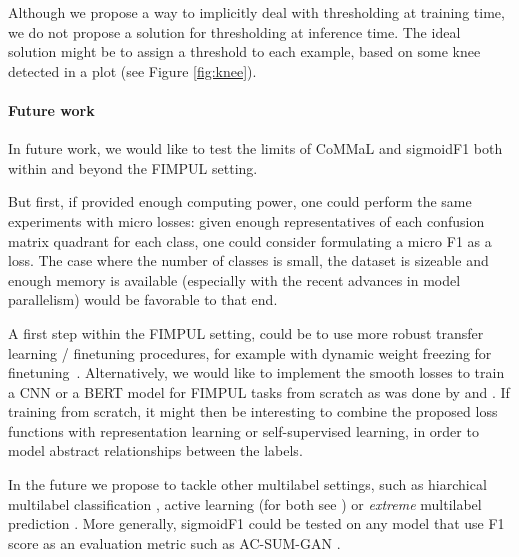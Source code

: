 Although we propose a way to implicitly deal with thresholding at training time, we do not propose a solution for thresholding at inference time. The ideal solution might be to assign a threshold to each example, based on some knee detected in a plot (see Figure \ref{fig:knee}).






\paragraph{Future work}
In future work, we would like to test the limits of CoMMaL and sigmoidF1 both within and beyond the FIMPUL setting.

But first, if provided enough computing power, one could perform the same experiments with micro losses: given enough representatives of each confusion matrix quadrant for each class, one could consider formulating a micro F1 as a loss. The case where the number of classes is small, the dataset is sizeable and enough memory is available (especially with the recent advances in model parallelism) would be favorable to that end.


A first step within the FIMPUL setting, could be to use more robust transfer learning / finetuning procedures, for example with dynamic weight freezing for finetuning~\cite{ULMFit}. Alternatively, we would like to implement the smooth losses to train a CNN or a BERT model for FIMPUL tasks from scratch as was done by \cite{tencent} and \cite{focalLoss}. If training from scratch, it might then be interesting to combine the proposed loss functions with representation learning \cite{unsupervisedImage,highResRepresentation} or self-supervised learning, in order to model abstract relationships between the labels.

In the future we propose to tackle other multilabel settings, such as hiarchical multilabel classification \cite{HARAM},  active learning (for both see \cite{activeLearningMultiLabel}) or \emph{extreme} multilabel prediction \cite{extremeMultilabelText, extremeSIGIR}. More generally, sigmoidF1 could be tested on any model that use F1 score as an evaluation metric such as AC-SUM-GAN \cite{AC-SUM-GAN}.

